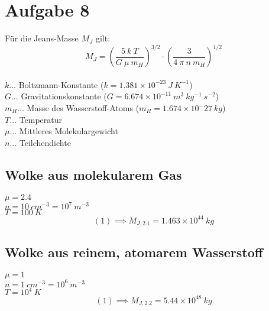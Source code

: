 \section{Aufgabe 8}
Für die Jeans-Masse \(M_J\) gilt:
\begin{equation}
M_J = \left(\frac{5~k~T}{G~\mu~m_H}\right)^{3/2} \cdot \left(\frac{3}{4~\pi~n~m_H}\right)^{1/2}
\end{equation}
\\
\(k\dots\) Boltzmann-Konstante (\(k = 1.381 \times 10^{-23}~J~K^{-1}\))\\
\(G\dots\) Gravitationskonstante (\(G = 6.674 \times 10^{-11}~m^3~kg^{-1}~s^{-2}\))\\
\(m_H\dots\) Masse des Wasserstoff-Atoms (\(m_H = 1.674 \times 10^-27~kg\))\\
\(T\dots\) Temperatur\\
\(\mu\dots\) Mittleres Molekulargewicht\\
\(n\dots\) Teilchendichte

\subsection{Wolke aus molekularem Gas}
\(\mu = 2.4\)\\
\(n = 10~cm^{-3} = 10^7~m^{-3}\)\\
\(T = 100~K\)
\\
\begin{equation}
(1) \implies M_{J,2.1} = 1.463 \times 10^{44}~kg
\end{equation}

\subsection{Wolke aus reinem, atomarem Wasserstoff}
\(\mu = 1\)\\
\(n = 1~cm^{-3} = 10^6~m^{-3}\)\\
\(T = 10^4~K\)
\\
\begin{equation}
(1) \implies M_{J,2.2} = 5.44 \times 10^{48}~kg
\end{equation}

